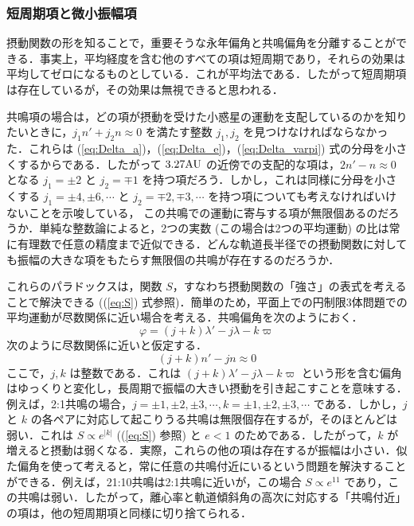 \documentclass[11pt,a4paper,oneside,onecolumn]{jreport}
\begin{document}
\subsubsection{短周期項と微小振幅項}
摂動関数の形を知ることで，重要そうな永年偏角と共鳴偏角を分離することができる．事実上，平均経度を含む他のすべての項は短周期であり，それらの効果は平均してゼロになるものとしている．これが平均法である．したがって短周期項は存在しているが，その効果は無視できると思われる．

共鳴項の場合は，どの項が摂動を受けた小惑星の運動を支配しているのかを知りたいときに，$j_1 n' + j_2 n \approx 0$ を満たす整数 $j_1, j_2$ を見つけなければならなかった．これらは (\ref{eq:Delta_a})，(\ref{eq:Delta_e})，(\ref{eq:Delta_varpi}) 式の分母を小さくするからである．したがって $3.27 {\rm AU}$ の近傍での支配的な項は，$2 n' - n \approx 0$ となる $j_1 = \pm 2$ と $j_2 = \mp 1$ を持つ項だろう．しかし，これは同様に分母を小さくする $j_1 = \pm 4, \pm 6, \cdots$ と $j_2 = \mp 2, \mp 3, \cdots$ を持つ項についても考えなければいけないことを示唆している，  
この共鳴での運動に寄与する項が無限個あるのだろうか．単純な整数論によると，2つの実数 (この場合は2つの平均運動) の比は常に有理数で任意の精度まで近似できる．どんな軌道長半径での摂動関数に対しても振幅の大きな項をもたらす無限個の共鳴が存在するのだろうか．

これらのパラドックスは，関数 $S$，すなわち摂動関数の「強さ」の表式を考えることで解決できる ((\ref{eq:S}) 式参照)．簡単のため，平面上での円制限3体問題での平均運動が尽数関係に近い場合を考える．共鳴偏角を次のようにおく．
\begin{equation}
\varphi = (j + k) \lambda' - j \lambda - k \varpi
\end{equation}
次のように尽数関係に近いと仮定する．
\begin{equation}
(j + k) n' - j n \approx 0
\end{equation}
ここで，$j, k$ は整数である．これは $(j + k) \lambda' - j \lambda - k \varpi$ という形を含む偏角はゆっくりと変化し，長周期で振幅の大きい摂動を引き起こすことを意味する．例えば，2:1共鳴の場合，$j = \pm 1, \pm 2, \pm 3, \cdots, k = \pm 1, \pm 2, \pm 3, \cdots$ である．しかし，$j$ と $k$ の各ペアに対応して起こりうる共鳴は無限個存在するが，そのほとんどは弱い．これは $S \propto e^{|k|}$ ((\ref{eq:S}) 参照) と $e < 1$ のためである．したがって，$k$ が増えると摂動は弱くなる．実際，これらの他の項は存在するが振幅は小さい．似た偏角を使って考えると，常に任意の共鳴付近にいるという問題を解決することができる．例えば，21:10共鳴は2:1共鳴に近いが，この場合 $S \propto e^{11}$ であり，この共鳴は弱い．したがって，離心率と軌道傾斜角の高次に対応する「共鳴付近」の項は，他の短周期項と同様に切り捨てられる．
\end{document}

